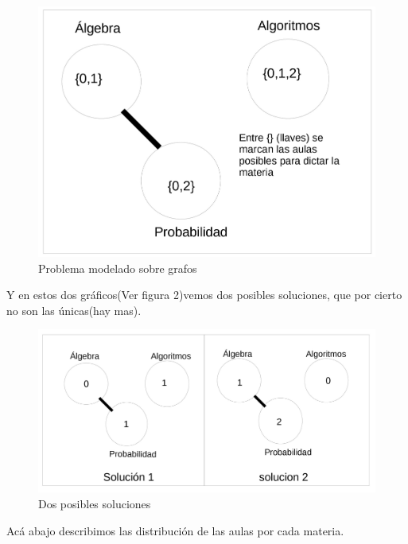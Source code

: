 \documentclass[a4paper]{article}
\begin{document}
\begin{figure}[H]
  \begin{center}
      \includegraphics[scale=0.60]{imagenes/informeImg/GrafoEjemplo1.jpg}
  \end{center}
  \caption{Problema modelado sobre grafos}
\end{figure}
Y en estos dos gráficos(Ver figura 2)vemos dos posibles soluciones, que por cierto no son las únicas(hay mas).
\begin{figure}[H]
  \begin{center}
      \includegraphics[scale=0.75]{imagenes/informeImg/GrafoSolucion1.jpg}
  \end{center}
  \caption{Dos posibles soluciones}
\end{figure}

Acá abajo describimos las distribución de las aulas por cada materia.
\end{document}
